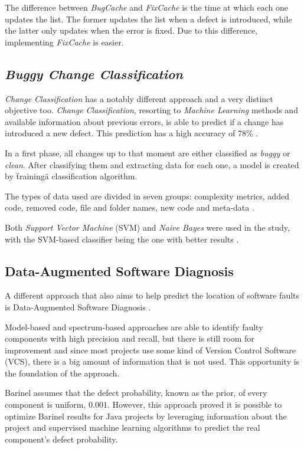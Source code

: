 The difference between \emph{BugCache} and \emph{FixCache} is the time at which each one updates the list. The former updates the list when a defect is introduced, while the latter only updates when the error is fixed. Due to this difference, implementing \emph{FixCache} is easier.

\subsection{\emph{Buggy Change Classification}}

\emph{Change Classification} has a notably different approach and a very distinct objective too. \emph{Change Classification}, resorting to \emph{Machine Learning} methods and available information about previous errors, is able to predict if a change has introduced a new defect. This prediction has a high accuracy of 78\% \cite{Whitehead2008}.

In a first phase, all changes up to that moment are either classified as \emph{buggy} or \emph{clean}. After classifying them and extracting data for each one, a model is created by \"training\" a classification algorithm.

The types of data used are divided in seven groups: complexity metrics, added code, removed code, file and folder names, new code and meta-data \cite{Whitehead2008}.

Both \emph{Support Vector Machine} (SVM) and \emph{Naive Bayes} were used in the study, with the SVM-based classifier being the one with better results \cite{Whitehead2008}.

\subsection{Data-Augmented Software Diagnosis} \label{subsec:elmishali}

A different approach that also aims to help predict the location of software faults is Data-Augmented Software Diagnosis \cite{Elmishali}.

Model-based and spectrum-based approaches are able to identify faulty components with high precision and recall, but there is still room for improvement and since most projects use some kind of Version Control Software (VCS), there is a big amount of information that is not used. This opportunity is the foundation of the approach.

Barinel assumes that the defect probability, known as the prior, of every component is uniform, $0.001$. However, this approach proved it is possible to optimize Barinel results for Java projects by leveraging information about the project and supervised machine learning algorithms to predict the real component's defect probability.

